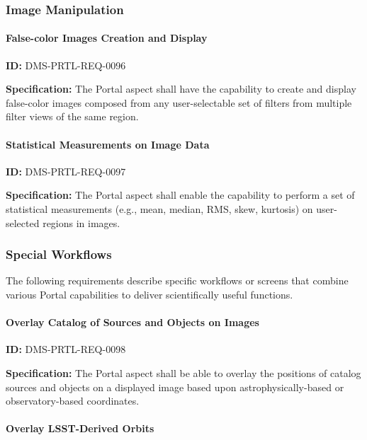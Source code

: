 \documentclass[SE,toc,lsstdraft]{lsstdoc}
\begin{document}
\subsubsection{Image Manipulation}

\paragraph{False-color Images Creation and Display}\hfill  %

\label{DMS-PRTL-REQ-0096}
\textbf{ID:} DMS-PRTL-REQ-0096

\textbf{Specification:}
The Portal aspect shall have the capability to create and display false-color images composed from any user-selectable set of filters from multiple filter views of the same region.

\paragraph{Statistical Measurements on Image Data}\hfill  %

\label{DMS-PRTL-REQ-0097}
\textbf{ID:} DMS-PRTL-REQ-0097

\textbf{Specification:}
The Portal aspect shall enable the capability to perform a set of statistical measurements (e.g., mean, median, RMS, skew, kurtosis) on user-selected regions in images.

\subsubsection{Special Workflows}

The following requirements describe specific workflows or screens that combine various Portal capabilities to deliver scientifically useful functions.

\paragraph{Overlay Catalog of Sources and Objects on Images}\hfill  %

\label{DMS-PRTL-REQ-0098}
\textbf{ID:} DMS-PRTL-REQ-0098

\textbf{Specification:}
The Portal aspect shall be able to overlay the positions of catalog sources and objects on a displayed image based upon astrophysically-based or observatory-based coordinates.

\paragraph{Overlay LSST-Derived Orbits}\hfill  %
\end{document}
